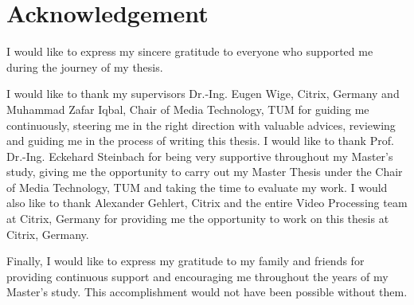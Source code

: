 
\thispagestyle{plain}

\section*{Acknowledgement}

I would like to express my sincere gratitude to everyone who supported me during the journey of my thesis.

I would like to thank my supervisors Dr.-Ing. Eugen Wige, Citrix, Germany and Muhammad Zafar Iqbal, Chair of Media Technology, TUM for guiding me continuously, steering me in the right direction with valuable advices, reviewing and guiding me in the process of writing this thesis. I would like to thank Prof. Dr.-Ing. Eckehard Steinbach for being very supportive throughout my Master's study, giving me the opportunity to carry out my Master Thesis under the Chair of Media Technology, TUM and taking the time to evaluate my work. I would also like to thank Alexander Gehlert, Citrix and the entire Video Processing team at Citrix, Germany for providing me the opportunity to work on this thesis at Citrix, Germany.

Finally, I would like to express my gratitude to my family and friends for providing continuous support and encouraging me throughout the years of my Master's study. This accomplishment would not have been possible without them.